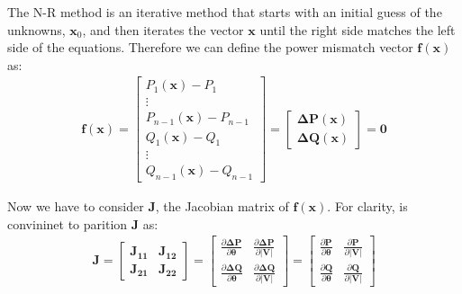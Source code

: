 \documentclass[a4paper,11pt, titlepage, twoside]{article}
\begin{document}
The N-R method is an iterative method that starts with an initial guess of the unknowns, $\mathbf{x}_0$, and then iterates the vector $\mathbf{x}$ until the right side matches the left side of the equations. Therefore we
can define the power mismatch vector $\mathbf{f(x)}$ as:
\begin{equation}
\begin{aligned}
    \mathbf{f(x)} = \begin{bmatrix}
    P_1(\mathbf{x}) - P_1 \\
    \vdots \\
    P_{n-1}(\mathbf{x}) - P_{n-1} \\
    Q_1(\mathbf{x}) - Q_1 \\
    \vdots \\
    Q_{n-1}(\mathbf{x}) - Q_{n-1}
    \end{bmatrix} = \begin{bmatrix}
    \mathbf{\Delta P(\mathbf{x})} \\
    \mathbf{\Delta Q(\mathbf{x})}
    \end{bmatrix} = \mathbf{0}
\end{aligned}
\label{powermismatch}
\end{equation}


Now we have to consider $\mathbf{J}$, the Jacobian matrix of $\mathbf{f(x)}$. For clarity, is convininet to parition $\mathbf{J}$ as:
\begin{equation}
\begin{aligned}
    \mathbf{J} = \begin{bmatrix}
    \mathbf{J_{11}} & \mathbf{J_{12}} \\
    \mathbf{J_{21}} & \mathbf{J_{22}}
    \end{bmatrix} = \begin{bmatrix}
        \frac{\partial \mathbf{\Delta P}}{\partial \mathbf{\theta}} & \frac{\partial \mathbf{\Delta P}}{\partial \mathbf{|V|}} \\
        \frac{\partial \mathbf{\Delta Q}}{\partial \mathbf{\theta}} & \frac{\partial \mathbf{\Delta Q}}{\partial \mathbf{|V|}}
    \end{bmatrix} = \begin{bmatrix}
    \frac{\partial \mathbf{P}}{\partial \mathbf{\theta}} & \frac{\partial \mathbf{P}}{\partial \mathbf{|V|}} \\
    \frac{\partial \mathbf{Q}}{\partial \mathbf{\theta}} & \frac{\partial \mathbf{Q}}{\partial \mathbf{|V|}}
    \end{bmatrix}
\end{aligned}
\end{equation}
\end{document}

